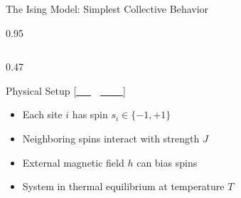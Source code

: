 \documentclass[9pt, aspectratio=169, t]{beamer}
\begin{document}
\begin{frame}{The Ising Model: Simplest Collective Behavior}
    \begin{cminipage}{0.95\textwidth}
    {\scriptsize
    \begin{columns}[T]
        \begin{column}{0.47\textwidth}
            \begin{block}{Physical Setup {\scriptsize[\href{https://doi.org/10.1007/BF02980577}{\textcolor{white}{Ising, 1925}}]}}
                \begin{itemize}\setlength{\itemsep}{0pt}
                    \item Each site $i$ has spin $s_i \in \{-1, +1\}$
                    \item Neighboring spins interact with strength $J$
                    \item External magnetic field $h$ can bias spins
                    \item System in thermal equilibrium at temperature $T$
                \end{itemize}
            \end{block}


\end{column}
\end{columns}}
\end{cminipage}
\end{frame}
\end{document}
